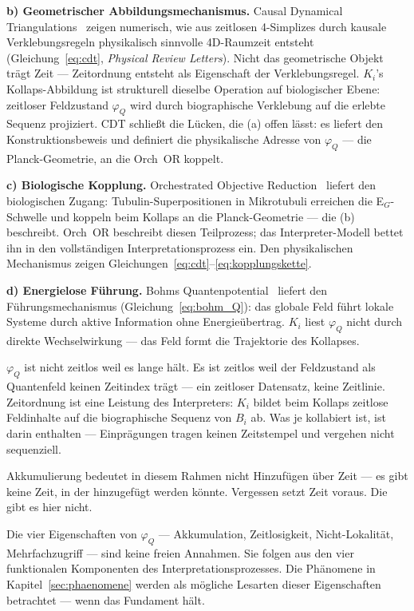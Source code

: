\documentclass[11pt,a4paper]{article}
\begin{document}
\textbf{b) Geometrischer Abbildungsmechanismus.}
Causal Dynamical Triangulations~\citep{ambjorn2004} zeigen numerisch, wie aus
zeitlosen 4-Simplizes durch kausale Verklebungsregeln physikalisch sinnvolle
4D-Raumzeit entsteht (Gleichung~\eqref{eq:cdt}, \emph{Physical Review Letters}).
Nicht das geometrische Objekt trägt Zeit — Zeitordnung entsteht als Eigenschaft
der Verklebungsregel. $K_i$'s Kollaps-Abbildung ist strukturell dieselbe
Operation auf biologischer Ebene: zeitloser Feldzustand $\varphi_Q$ wird durch
biographische Verklebung auf die erlebte Sequenz projiziert.
CDT schließt die Lücken, die (a) offen lässt: es liefert den
Konstruktionsbeweis und definiert die physikalische Adresse von $\varphi_Q$ —
die Planck-Geometrie, an die Orch~OR koppelt.

\textbf{c) Biologische Kopplung.}
Orchestrated Objective Reduction~\citep{penrose1994,hameroff2014} liefert den
biologischen Zugang: Tubulin-Superpositionen in Mikrotubuli erreichen die
E$_G$-Schwelle und koppeln beim Kollaps an die Planck-Geometrie — die (b)
beschreibt. Orch~OR beschreibt diesen Teilprozess; das Interpreter-Modell
bettet ihn in den vollständigen Interpretationsprozess ein.
Den physikalischen Mechanismus zeigen Gleichungen~\eqref{eq:cdt}–\eqref{eq:kopplungskette}.

\textbf{d) Energielose Führung.}
Bohms Quantenpotential~\citep{bohm1980} liefert den Führungsmechanismus
(Gleichung~\eqref{eq:bohm_Q}): das globale Feld führt lokale Systeme durch
aktive Information ohne Energieübertrag. $K_i$ liest $\varphi_Q$ nicht durch
direkte Wechselwirkung — das Feld formt die Trajektorie des Kollapses.

$\varphi_Q$ ist nicht zeitlos weil es lange hält. Es ist zeitlos weil der
Feldzustand als Quantenfeld keinen Zeitindex trägt — ein zeitloser Datensatz,
keine Zeitlinie. Zeitordnung ist eine Leistung des Interpreters: $K_i$ bildet
beim Kollaps zeitlose Feldinhalte auf die biographische Sequenz von $B_i$ ab.
Was je kollabiert ist, ist darin enthalten — Einprägungen tragen keinen
Zeitstempel und vergehen nicht sequenziell.

Akkumulierung bedeutet in diesem Rahmen nicht Hinzufügen über Zeit — es gibt
keine Zeit, in der hinzugefügt werden könnte. Vergessen setzt Zeit voraus.
Die gibt es hier nicht.

Die vier Eigenschaften von $\varphi_Q$ — Akkumulation, Zeitlosigkeit,
Nicht-Lokalität, Mehrfachzugriff — sind keine freien Annahmen. Sie folgen
aus den vier funktionalen Komponenten des Interpretationsprozesses.
Die Phänomene in Kapitel~\ref{sec:phaenomene} werden als mögliche Lesarten
dieser Eigenschaften betrachtet — wenn das Fundament hält.
\end{document}
